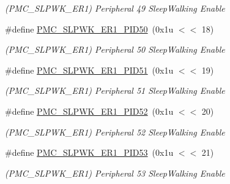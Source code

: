 \begin{DoxyCompactItemize}
\begin{DoxyCompactList}\small\item\em (P\+M\+C\+\_\+\+S\+L\+P\+W\+K\+\_\+\+E\+R1) Peripheral 49 Sleep\+Walking Enable \end{DoxyCompactList}\item 
\mbox{\label{group__SAME70__PMC_ga2204375d48ed2e8796182a8c5d7ea0b6}} 
\#define \mbox{\hyperlink{group__SAME70__PMC_ga2204375d48ed2e8796182a8c5d7ea0b6}{P\+M\+C\+\_\+\+S\+L\+P\+W\+K\+\_\+\+E\+R1\+\_\+\+P\+I\+D50}}~(0x1u $<$$<$ 18)
\begin{DoxyCompactList}\small\item\em (P\+M\+C\+\_\+\+S\+L\+P\+W\+K\+\_\+\+E\+R1) Peripheral 50 Sleep\+Walking Enable \end{DoxyCompactList}\item 
\mbox{\label{group__SAME70__PMC_ga7d4f43decce1ab022ad97379705cd05b}} 
\#define \mbox{\hyperlink{group__SAME70__PMC_ga7d4f43decce1ab022ad97379705cd05b}{P\+M\+C\+\_\+\+S\+L\+P\+W\+K\+\_\+\+E\+R1\+\_\+\+P\+I\+D51}}~(0x1u $<$$<$ 19)
\begin{DoxyCompactList}\small\item\em (P\+M\+C\+\_\+\+S\+L\+P\+W\+K\+\_\+\+E\+R1) Peripheral 51 Sleep\+Walking Enable \end{DoxyCompactList}\item 
\mbox{\label{group__SAME70__PMC_ga86c00b4ba113acdbff47547443c88252}} 
\#define \mbox{\hyperlink{group__SAME70__PMC_ga86c00b4ba113acdbff47547443c88252}{P\+M\+C\+\_\+\+S\+L\+P\+W\+K\+\_\+\+E\+R1\+\_\+\+P\+I\+D52}}~(0x1u $<$$<$ 20)
\begin{DoxyCompactList}\small\item\em (P\+M\+C\+\_\+\+S\+L\+P\+W\+K\+\_\+\+E\+R1) Peripheral 52 Sleep\+Walking Enable \end{DoxyCompactList}\item 
\mbox{\label{group__SAME70__PMC_gaf34707cc2f73df5e1a0d681c342273ef}} 
\#define \mbox{\hyperlink{group__SAME70__PMC_gaf34707cc2f73df5e1a0d681c342273ef}{P\+M\+C\+\_\+\+S\+L\+P\+W\+K\+\_\+\+E\+R1\+\_\+\+P\+I\+D53}}~(0x1u $<$$<$ 21)
\begin{DoxyCompactList}\small\item\em (P\+M\+C\+\_\+\+S\+L\+P\+W\+K\+\_\+\+E\+R1) Peripheral 53 Sleep\+Walking Enable \end{DoxyCompactList}\item 

\end{DoxyCompactItemize}
